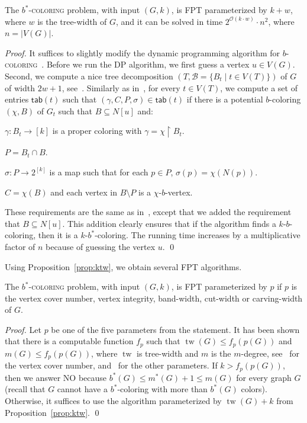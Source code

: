 \documentclass[runningheads, envcountsame]{llncs}
\newcommand{\sep}{\;|\;}
\newcommand{\seq}{\subseteq}
\newcommand{\ca}{\mathcal}
\DeclareMathOperator{\tw}{tw}
\newcommand{\FPT}{\textsf{FPT}\xspace}
\newcommand\tab{\mathsf{tab}}
\newcommand{\bscoloring}{$b^*$-\textsc{coloring}\xspace}
\newcommand{\bcoloring}{$b$-\textsc{coloring}\xspace}
\begin{document}
\begin{proposition}\label{prop:ktw}
The \bscoloring problem, with input $(G, k)$, is \FPT parameterized by $k + w$, where $w$ is the tree-width of $G$, and it can be solved in time $2^{\ca O(k \cdot w)} \cdot n^2$, where $n = |V(G)|$.
\end{proposition}
\begin{proof}
It suffices to slightly modify the dynamic programming algorithm for \bcoloring~\cite[Proposition 2.1]{JaffkeLL24}.
Before we run the DP algorithm, we first guess a vertex $u \in V(G)$.
Second, we compute a nice tree decomposition $(T, \ca B = \{B_t \sep t \in V(T)\})$ of $G$ of width $2w + 1$, see~\cite{Korhonen21,Kloks94}.
Similarly as in~\cite{JaffkeLL24}, for every $t \in V(T)$, we compute a set of entries $\tab(t)$ such that $(\gamma, C, P, \sigma) \in \tab(t)$ if there is a potential $b$-coloring $(\chi, B)$ of $G_t$ such that $B \seq N[u]$ and:
\begin{compactenum}
\item $\gamma \colon B_t \to [k]$ is a proper coloring with $\gamma = \chi \upharpoonright B_t$.
\item $P = B_t \cap B$.
\item $\sigma \colon P \to 2^{[k]}$ is a map such that for each $p \in P$, $\sigma(p) = \chi(N(p))$.
\item $C = \chi(B)$ and each vertex in $B \setminus P$ is a $\chi$-$b$-vertex.
\end{compactenum}

These requirements are the same as in~\cite{JaffkeLL24}, except that we added the requirement that $B \seq N[u]$.
This addition clearly ensures that if the algorithm finds a $k$-$b$-coloring, then it is a $k$-$b^*$-coloring.
The running time increases by a multiplicative factor of $n$ because of guessing the vertex $u$.
\qed\end{proof}

Using Proposition~\ref{prop:ktw}, we obtain several \FPT algorithms.

\begin{proposition}
The \bscoloring problem, with input $(G, k)$, is \FPT parameterized by $p$ if $p$ is the vertex cover number, vertex integrity, band-width, cut-width or carving-width of $G$.
\end{proposition}
\begin{proof}
Let $p$ be one of the five parameters from the statement.
It has been shown that there is a computable function $f_p$ such that $\tw(G) \le f_p(p(G))$ and $m(G) \le f_p(p(G))$, where $\tw$ is tree-width and $m$ is the $m$-degree, see~\cite{JaffkeLL24} for the vertex cover number, and~\cite{DBLP:conf/mfcs/Balaban26} for the other parameters.
If $k > f_p(p(G))$, then we answer NO because $b^*(G) \le m^*(G)+1 \le m(G)$ for every graph $G$ (recall that $G$ cannot have a $b^*$-coloring with more than $b^*(G)$ colors).
Otherwise, it suffices to use the algorithm parameterized by $\tw(G) + k$ from Proposition~\ref{prop:ktw}.
\qed\end{proof}
\end{document}
